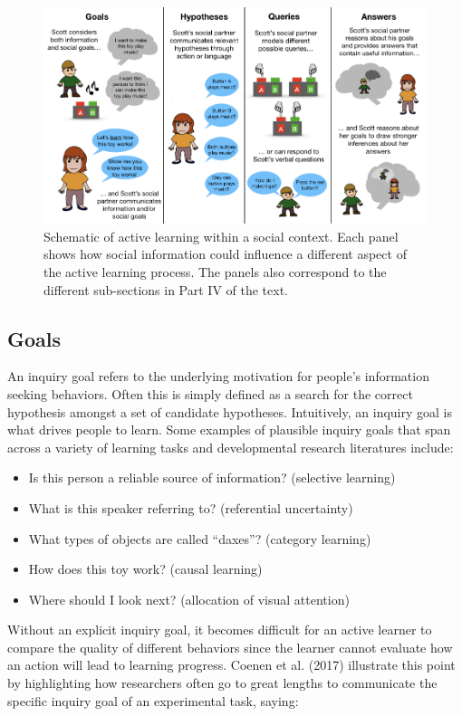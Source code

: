 \documentclass[english,floatsintext,man]{apa6}
\providecommand{\tightlist}{%
  \setlength{\itemsep}{0pt}\setlength{\parskip}{0pt}}
\theoremstyle{definition}
\theoremstyle{definition}
\theoremstyle{definition}
\theoremstyle{remark}
\begin{document}
\begin{figure}[tb]
\includegraphics[width=0.95\linewidth]{macdonald_cada_files/figure-latex/unnamed-chunk-3-1} \caption{Schematic of active learning within a social context. Each panel shows how social information could influence a different aspect of the active learning process. The panels also correspond to the different sub-sections in Part IV of the text. }\label{fig:unnamed-chunk-3}
\end{figure}

\subsection{Goals}\label{goals}

An inquiry goal refers to the underlying motivation for people's
information seeking behaviors. Often this is simply defined as a search
for the correct hypothesis amongst a set of candidate hypotheses.
Intuitively, an inquiry goal is what drives people to learn. Some
examples of plausible inquiry goals that span across a variety of
learning tasks and developmental research literatures include:

\begin{itemize}
\tightlist
\item
  Is this person a reliable source of information? (selective learning)
\item
  What is this speaker referring to? (referential uncertainty)
\item
  What types of objects are called \enquote{daxes}? (category learning)
\item
  How does this toy work? (causal learning)
\item
  Where should I look next? (allocation of visual attention)
\end{itemize}

\noindent
Without an explicit inquiry goal, it becomes difficult for an active
learner to compare the quality of different behaviors since the learner
cannot evaluate how an action will lead to learning progress. Coenen et
al. (2017) illustrate this point by highlighting how researchers often
go to great lengths to communicate the specific inquiry goal of an
experimental task, saying:
\end{document}
